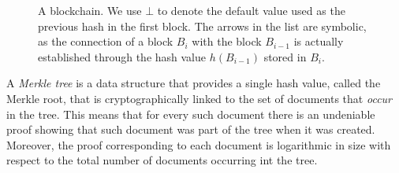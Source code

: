 \begin{figure}
\caption{A blockchain. We use $\bot$ to denote the default value used as the previous hash in the first block. The arrows in the list are symbolic, as the connection of a block $B_i$ with the block $B_{i-1}$ is actually established through the hash value $h(B_{i-1})$ stored in $B_i$.}
\label{hashlist}
\end{figure}

A {\em Merkle tree} is a data structure that provides a single hash value, called the Merkle root, that is cryptographically linked to the set of documents that \emph{occur} in the tree. This means that for every such document there is an undeniable proof showing that such document was part of the tree when it was created. Moreover, the proof corresponding to each document is logarithmic in size with respect to the total number of documents occurring int the tree.

